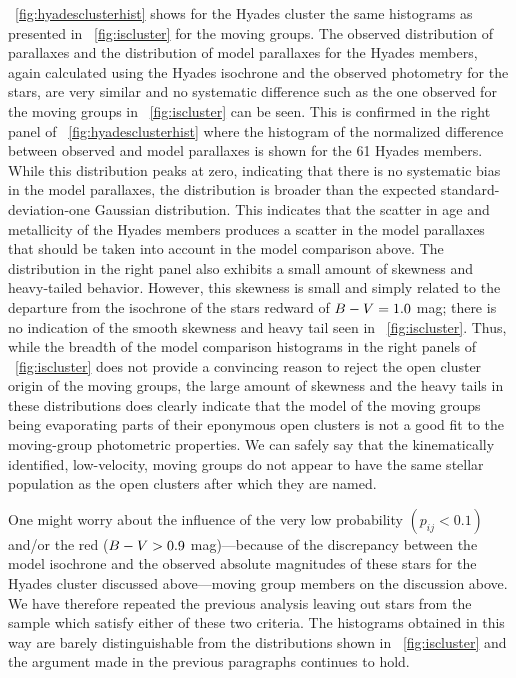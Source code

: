 \figurename~\ref{fig:hyadesclusterhist} shows for the Hyades cluster
the same histograms as presented in \figurename~\ref{fig:iscluster}
for the moving groups. The observed distribution of parallaxes and the
distribution of model parallaxes for the Hyades members, again
calculated using the Hyades isochrone and the observed photometry for
the stars, are very similar and no systematic difference such as the
one observed for the moving groups in \figurename~\ref{fig:iscluster}
can be seen. This is confirmed in the right panel of
\figurename~\ref{fig:hyadesclusterhist} where the histogram of the
normalized difference between observed and model parallaxes is shown
for the 61 Hyades members. While this distribution peaks at zero,
indicating that there is no systematic bias in the model parallaxes,
the distribution is broader than the expected standard-deviation-one
Gaussian distribution. This indicates that the scatter in age and
metallicity of the Hyades members produces a scatter in the model
parallaxes that should be taken into account in the model comparison
above. The distribution in the right panel also exhibits a small
amount of skewness and heavy-tailed behavior. However, this skewness
is small and simply related to the departure from the isochrone of the
stars redward of $B-V = 1.0$ mag; there is no indication of the
smooth skewness and heavy tail seen in
\figurename~\ref{fig:iscluster}. Thus, while the breadth of the model
comparison histograms in the right panels of
\figurename~\ref{fig:iscluster} does not provide a convincing reason
to reject the open cluster origin of the moving groups, the large
amount of skewness and the heavy tails in these distributions does
clearly indicate that the model of the moving groups being evaporating
parts of their eponymous open clusters is not a good fit to the
moving-group photometric properties. We can safely say that the
kinematically identified, low-velocity, moving groups do not appear to
have the same stellar population as the open clusters after which they
are named.

One might worry about the influence of the very low probability
$(p_{ij} < 0.1)$ and/or the red ($B-V > 0.9$ mag)---because of
the discrepancy between the model isochrone and the observed absolute
magnitudes of these stars for the Hyades cluster discussed
above---moving group members on the discussion above. We have
therefore repeated the previous analysis leaving out stars from the
sample which satisfy either of these two criteria. The histograms
obtained in this way are barely distinguishable from the distributions
shown in \figurename~\ref{fig:iscluster} and the argument made in the
previous paragraphs continues to hold.

